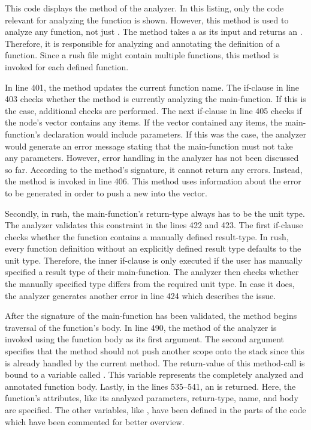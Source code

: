 
This code displays the  method of the analyzer.
In this listing, only the code relevant for analyzing the  function is shown.
However, this method is used to analyze any function, not just .
The method  takes a  as its input and returns an .
Therefore, it is responsible for analyzing and annotating the definition of a function.
Since a rush file might contain multiple functions, this method is invoked for each defined function.

In line 401, the method updates the current function name.
The if-clause in line 403 checks whether the method is currently analyzing the main-function.
If this is the case, additional checks are performed.
The next if-clause in line 405 checks if the node's  vector contains any items.
If the vector contained any items, the main-function's declaration would include parameters.
If this was the case, the analyzer would generate an error message stating that the main-function must not take any parameters.
However, error handling in the analyzer has not been discussed so far.
According to the method's signature, it cannot return any errors.
Instead, the  method is invoked in line 406.
This method uses information about the error to be generated in order to push a new  into the  vector.

Secondly, in rush, the main-function's return-type always has to be the unit type.
The analyzer validates this constraint in the lines 422 and 423.
The first if-clause checks whether the function contains a manually defined result-type.
In rush, every function definition without an explicitly defined result type defaults to the unit type.
Therefore, the inner if-clause is only executed if the user has manually specified a result type of their main-function.
The analyzer then checks whether the manually specified type differs from the required unit type.
In case it does, the analyzer generates another error in line 424 which describes the issue.

After the signature of the main-function has been validated, the method begins traversal of the function's body.
In line 490, the  method of the analyzer is invoked using the function body as its first argument.
The second argument specifies that the method should not push another scope onto the stack since this is already handled by the current method.
The return-value of this method-call is bound to a variable called .
This variable represents the completely analyzed and annotated function body.
Lastly, in the lines 535--541, an  is returned.
Here, the function's attributes, like its analyzed parameters, return-type, name, and body are specified.
The other variables, like , have been defined in the parts of the code which have been commented for better overview.

